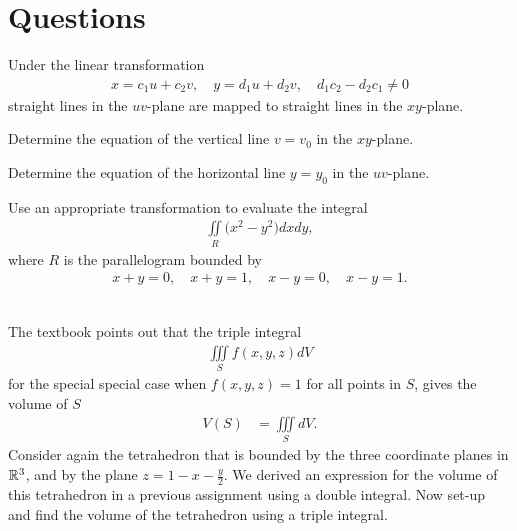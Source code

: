\documentclass{article}
\begin{document}
\section*{Questions}
\BEN
\item %
Under the linear transformation 
\begin{align*}
  x = c_1u + c_2v , \quad y =d_1u + d_2v, \quad d_1c_2 - d_2c_1 \ne 0
\end{align*}
straight lines in the $uv$-plane are mapped to straight lines in the $xy$-plane. 
\BEN
\item Determine the equation of the vertical line $v=v_0$ in the $xy$-plane. 
\item Determine the equation of the horizontal line $y=y_0$ in the $uv$-plane.
\EEN
\item %
Use an appropriate transformation to evaluate the integral
\begin{align*}
  \iint\limits_R \big(x^2 - y^2\big) dxdy,
\end{align*}
where $R$ is the parallelogram bounded by 
\begin{align*}
  x+y = 0, \quad x+y = 1, \quad x-y=0, \quad x-y=1.
\end{align*}
\item %
 \\
The textbook points out that the triple integral 
\begin{align*}
  \iiint\limits_S f(x,y,z) dV
\end{align*}
for the special special case when $f(x,y,z) = 1$ for all points in $S$, gives the volume of $S$
\begin{align*}
  V(S) &= \iiint\limits_S dV.
\end{align*}
Consider again the tetrahedron that is bounded by the three coordinate planes in $\mathbb{R}^3$, and by the plane $z = 1 - x - \frac{y}{2}$. We derived an expression for the volume of this tetrahedron in a previous assignment using a double integral. Now set-up and find the volume of the tetrahedron using a triple integral.
\end{document}
